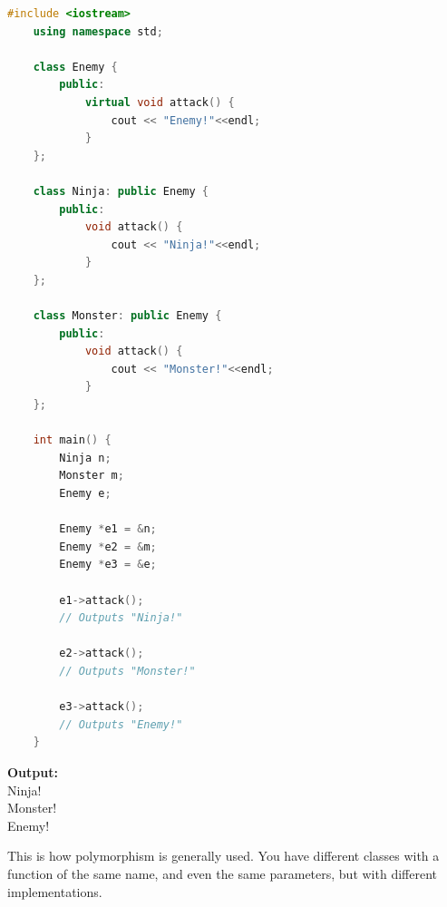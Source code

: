 \documentclass[12pt , a4paper]{article}
\begin{document}
	\begin{lstlisting}[language=C++]
	#include <iostream>
	using namespace std;
	
	class Enemy {
	    public:
	        virtual void attack() {
	            cout << "Enemy!"<<endl;
	        }
	};
	
	class Ninja: public Enemy {
	    public:
	        void attack() {
	            cout << "Ninja!"<<endl;
	        }
	};
	
	class Monster: public Enemy {
	    public:
	        void attack() {
	            cout << "Monster!"<<endl;
	        }
	};
	
	int main() {
	    Ninja n;
	    Monster m;
	    Enemy e;
	
	    Enemy *e1 = &n;
	    Enemy *e2 = &m;
	    Enemy *e3 = &e;
	
	    e1->attack();
	    // Outputs "Ninja!"
	
	    e2->attack();
	    // Outputs "Monster!"
	
	    e3->attack();
	    // Outputs "Enemy!"
	}		
	\end{lstlisting}
	\begin{tcolorbox}
	\textbf{Output:}\\
	Ninja!\\
	Monster!\\
	Enemy!
	\end{tcolorbox}

	\begin{importantBox}
	This is how polymorphism is generally used. You have different classes with a function of the same name, and even the same parameters, but with different implementations.
	\end{importantBox}

\end{document}
